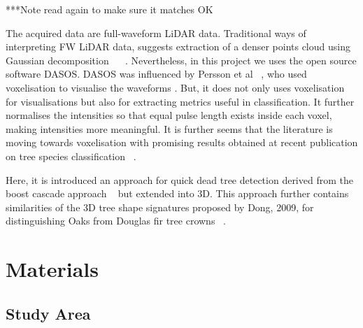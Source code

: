 \documentclass{subfiles}
\begin{document}
{\color{red} ***Note read again to make sure it matches OK}
\par The acquired data are full-waveform LiDAR data. Traditional ways of interpreting FW LiDAR data, suggests extraction of a denser points cloud using Gaussian decomposition ~\cite{Neuenschwander2009} ~\cite{Reitberger2008}. Nevertheless, in this project we uses the open source software DASOS. DASOS was influenced by Persson et al ~\cite{Persson2005}, who used voxelisation to visualise the waveforms . But, it does not only uses voxelisation for visualisations but also for extracting metrics useful in classification. It further normalises the intensities so that equal pulse length exists inside each voxel, making intensities more meaningful. It is further seems that the literature is moving towards voxelisation with promising results obtained at recent publication on tree species classification ~\cite{Cao2016}. 

Here, it is introduced an approach for quick dead tree detection derived from the boost cascade approach ~\cite{Viola2001} but extended into 3D. This approach further contains similarities of the 3D tree shape signatures proposed by Dong, 2009, for distinguishing Oaks from Douglas fir tree crowns ~\cite{Dong2009}. 












\section{Materials}


\subsection{Study Area} \label{sec:StudyArea}
\end{document}
